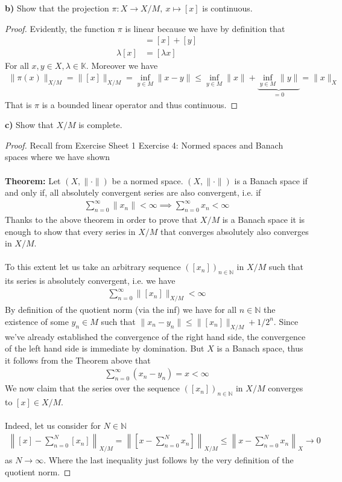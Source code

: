 \documentclass[12pt,a4paper]{article}
\theoremstyle{definition}
\begin{document}
\noindent \textbf{b)} Show that the projection $\pi : X \to X/M, \ x \mapsto [x]$ is continuous. 
\begin{proof}
Evidently, the function $\pi$ is linear because we have by definition that
\begin{align*}
[x+y]&=[x]+[y] \\
\lambda [x] &= [\lambda x]  
\end{align*}
For all $x,y \in X, \lambda \in \mathbb{K}$. Moreover we have 
\begin{align*}
\| \pi(x) \|_{X/M} = \| [x] \|_{X/M} = \inf_{y \in M} \| x-y\| \leq \inf_{y \in M} \| x\| + \underbrace{\inf_{y \in M} \| y \|}_{=0} = \|x\|_X 
\end{align*}
That is $\pi$ is a bounded linear operator and thus continuous. 
\end{proof}
\newpage
\noindent \textbf{c)} Show that $X/M$ is complete.
\begin{proof}
Recall from Exercise Sheet 1 Exercise 4: Normed spaces and Banach spaces where we have shown
\\\\
\textbf{Theorem:} Let $(X, \| \cdot \|)$ be a normed space. $(X, \| \cdot \|)$ is a Banach space if and only if, all absolutely convergent series are also convergent, i.e. if 
\begin{align*}
\sum_{n=0}^\infty \|x_n\| < \infty \implies \sum_{n=0}^\infty x_n < \infty 
\end{align*}
Thanks to the above theorem in order to prove that $X/M$ is a Banach space it is enough to show that every series in $X/M$ that converges absolutely also converges in $X/M$. 
\\\\
To this extent let us take an arbitrary sequence $([x_n])_{n \in \mathbb{N}}$ in $X/M$ such that its series is absolutely convergent, i.e. we have 
\begin{align*}
\sum_{n=0}^\infty \|[x_n]\|_{X/M} < \infty 
\end{align*}
By definition of the quotient norm (via the inf) we have for all $n \in \mathbb{N}$ the existence of some $y_n \in M$ such that $\|x_n-y_n \| \leq \|[x_n]\|_{X/M} + 1/2^n$. Since we've already established the convergence of the right hand side, the convergence of the left hand side is immediate by domination. But $X$ is a Banach space, thus it follows from the Theorem above that
\begin{align*}
\sum_{n=0}^\infty (x_n-y_n)=x < \infty 
\end{align*}
We now claim that the series over the sequence $([x_n])_{n \in \mathbb{N}}$ in $X/M$ converges to $[x] \in X/M$. 
\\\\
Indeed, let us consider for $N \in \mathbb{N}$ 
\begin{align*}
\left\| [x]- \sum_{n=0}^N [x_n] \right\|_{X/M} = \left\| [x - \sum_{n=0}^N x_n] \right\|_{X/M}  \leq \left\| x- \sum_{n=0}^N x_n \right\|_X \to 0 
\end{align*}
as $N \to \infty$. Where the last inequality just follows by the very definition of the quotient norm. 
\end{proof} 
\end{document}
